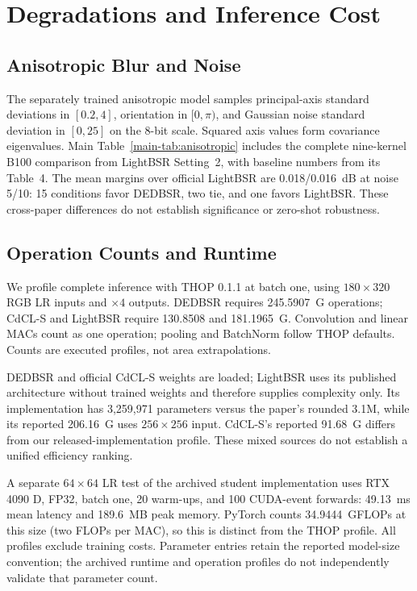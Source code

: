 \documentclass[10pt,journal,letterpaper]{IEEEtran}
\begin{document}
\section{Degradations and Inference Cost}
\label{sec:supp_efficiency}
\subsection{Anisotropic Blur and Noise}
The separately trained anisotropic model samples principal-axis standard deviations in $[0.2,4]$, orientation in $[0,\pi)$, and Gaussian noise standard deviation in $[0,25]$ on the 8-bit scale. Squared axis values form covariance eigenvalues. Main Table~\ref{main-tab:anisotropic} includes the complete nine-kernel B100 comparison from LightBSR Setting~2, with baseline numbers from its Table~4. The mean margins over official LightBSR are 0.018/0.016~dB at noise 5/10: 15 conditions favor DEDBSR, two tie, and one favors LightBSR. These cross-paper differences do not establish significance or zero-shot robustness.


\subsection{Operation Counts and Runtime}


We profile complete inference with THOP 0.1.1 at batch one, using $180\times320$ RGB LR inputs and $\times4$ outputs. DEDBSR requires 245.5907~G operations; CdCL-S and LightBSR require 130.8508 and 181.1965~G. Convolution and linear MACs count as one operation; pooling and BatchNorm follow THOP defaults. Counts are executed profiles, not area extrapolations.

DEDBSR and official CdCL-S weights are loaded; LightBSR uses its published architecture without trained weights and therefore supplies complexity only. Its implementation has 3,259,971 parameters versus the paper's rounded 3.1M, while its reported 206.16~G uses $256\times256$ input. CdCL-S's reported 91.68~G differs from our released-implementation profile. These mixed sources do not establish a unified efficiency ranking.

A separate $64\times64$ LR test of the archived student implementation uses RTX 4090 D, FP32, batch one, 20 warm-ups, and 100 CUDA-event forwards: 49.13~ms mean latency and 189.6~MB peak memory. PyTorch counts 34.9444~GFLOPs at this size (two FLOPs per MAC), so this is distinct from the THOP profile. All profiles exclude training costs. Parameter entries retain the reported model-size convention; the archived runtime and operation profiles do not independently validate that parameter count.
\end{document}
